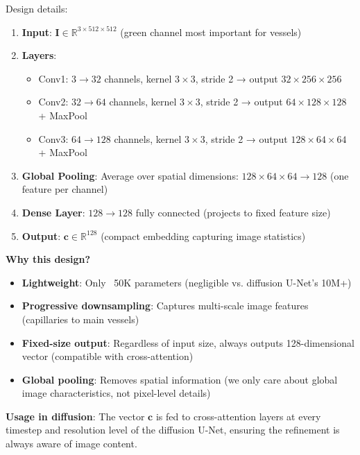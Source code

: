 \documentclass[11pt]{article}
\begin{document}
Design details:
\begin{enumerate}
    \item \textbf{Input}: $\mathbf{I} \in \mathbb{R}^{3 \times 512 \times 512}$ (green channel most important for vessels)
    
    \item \textbf{Layers}:
    \begin{itemize}
        \item Conv1: $3 \to 32$ channels, kernel $3 \times 3$, stride 2 → output $32 \times 256 \times 256$
        \item Conv2: $32 \to 64$ channels, kernel $3 \times 3$, stride 2 → output $64 \times 128 \times 128$ + MaxPool
        \item Conv3: $64 \to 128$ channels, kernel $3 \times 3$, stride 2 → output $128 \times 64 \times 64$ + MaxPool
    \end{itemize}
    
    \item \textbf{Global Pooling}: Average over spatial dimensions: $128 \times 64 \times 64 \to 128$ (one feature per channel)
    
    \item \textbf{Dense Layer}: $128 \to 128$ fully connected (projects to fixed feature size)
    
    \item \textbf{Output}: $\mathbf{c} \in \mathbb{R}^{128}$ (compact embedding capturing image statistics)
\end{enumerate}

\textbf{Why this design?}
\begin{itemize}
    \item \textbf{Lightweight}: Only ~50K parameters (negligible vs. diffusion U-Net's 10M+)
    \item \textbf{Progressive downsampling}: Captures multi-scale image features (capillaries to main vessels)
    \item \textbf{Fixed-size output}: Regardless of input size, always outputs 128-dimensional vector (compatible with cross-attention)
    \item \textbf{Global pooling}: Removes spatial information (we only care about global image characteristics, not pixel-level details)
\end{itemize}

\textbf{Usage in diffusion}: The vector $\mathbf{c}$ is fed to cross-attention layers at every timestep and resolution level of the diffusion U-Net, ensuring the refinement is always aware of image content.
\end{document}
